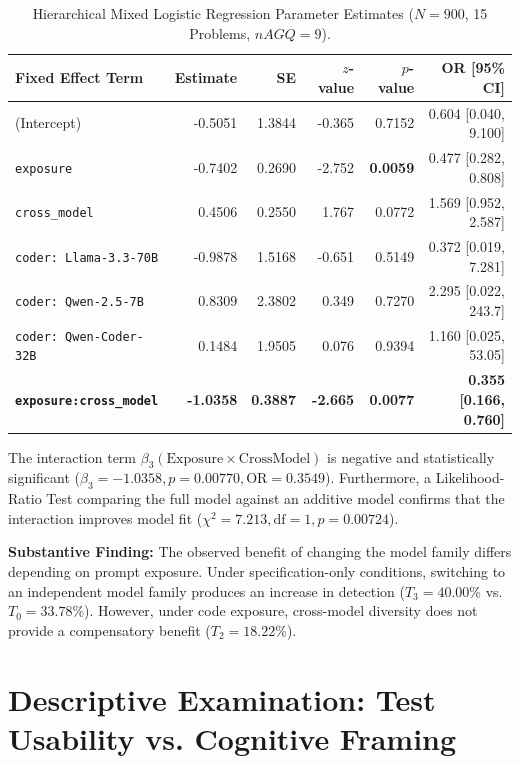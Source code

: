 \documentclass[11pt,a4paper]{article}
\begin{document}
\begin{table}[h]
\centering
\caption{Hierarchical Mixed Logistic Regression Parameter Estimates ($N=900$, 15 Problems, $nAGQ=9$).}
\label{tab:glmm_results}
\small
\renewcommand{\arraystretch}{1.15}
\begin{tabular}{lrrrrr}
\toprule
\textbf{Fixed Effect Term} & \textbf{Estimate} & \textbf{SE} & \textbf{$z$-value} & \textbf{$p$-value} & \textbf{OR [95\% CI]} \\
\midrule
(Intercept) & -0.5051 & 1.3844 & -0.365 & 0.7152 & 0.604 [0.040, 9.100] \\
\texttt{exposure} & -0.7402 & 0.2690 & -2.752 & \textbf{0.0059} & 0.477 [0.282, 0.808] \\
\texttt{cross\_model} & 0.4506 & 0.2550 & 1.767 & 0.0772 & 1.569 [0.952, 2.587] \\
\texttt{coder: Llama-3.3-70B} & -0.9878 & 1.5168 & -0.651 & 0.5149 & 0.372 [0.019, 7.281] \\
\texttt{coder: Qwen-2.5-7B} & 0.8309 & 2.3802 & 0.349 & 0.7270 & 2.295 [0.022, 243.7] \\
\texttt{coder: Qwen-Coder-32B} & 0.1484 & 1.9505 & 0.076 & 0.9394 & 1.160 [0.025, 53.05] \\
\textbf{\texttt{exposure:cross\_model}} & \textbf{-1.0358} & \textbf{0.3887} & \textbf{-2.665} & \textbf{0.0077} & \textbf{0.355 [0.166, 0.760]} \\
\bottomrule
\end{tabular}
\end{table}

The interaction term $\beta_3 (\text{Exposure} \times \text{CrossModel})$ is negative and statistically significant ($\beta_3 = -1.0358, p = 0.00770, \text{OR} = 0.3549$). Furthermore, a Likelihood-Ratio Test comparing the full model against an additive model confirms that the interaction improves model fit ($\chi^2 = 7.213, \text{df}=1, p = 0.00724$).

\textbf{Substantive Finding:} The observed benefit of changing the model family differs depending on prompt exposure. Under specification-only conditions, switching to an independent model family produces an increase in detection ($T_3 = 40.00\%$ vs. $T_0 = 33.78\%$). However, under code exposure, cross-model diversity does not provide a compensatory benefit ($T_2 = 18.22\%$).

\section{Descriptive Examination: Test Usability vs. Cognitive Framing}
\label{sec:deconstruction}
\end{document}
